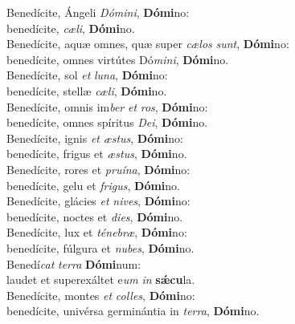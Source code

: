 \evenverse Benedícite, Ángeli \textit{Dó}\textit{mi}\textit{ni}, \textbf{Dó}\textbf{mi}no:~\*\\
\evenverse benedícite, \textit{cæ}\textit{li}, \textbf{Dó}\textbf{mi}no.\\
\oddverse Benedícite, aquæ omnes, quæ super \textit{cæ}\textit{los} \textit{sunt}, \textbf{Dó}\textbf{mi}no:~\*\\
\oddverse benedícite, omnes virtútes Dó\textit{mi}\textit{ni}, \textbf{Dó}\textbf{mi}no.\\
\evenverse Benedícite, sol \textit{et} \textit{lu}\textit{na}, \textbf{Dó}\textbf{mi}no:~\*\\
\evenverse benedícite, stellæ \textit{cæ}\textit{li}, \textbf{Dó}\textbf{mi}no.\\
\oddverse Benedícite, omnis im\textit{ber} \textit{et} \textit{ros}, \textbf{Dó}\textbf{mi}no:~\*\\
\oddverse benedícite, omnes spíritus \textit{De}\textit{i}, \textbf{Dó}\textbf{mi}no.\\
\evenverse Benedícite, ignis \textit{et} \textit{æ}\textit{stus}, \textbf{Dó}\textbf{mi}no:~\*\\
\evenverse benedícite, frigus et \textit{æ}\textit{stus}, \textbf{Dó}\textbf{mi}no.\\
\oddverse Benedícite, rores et \textit{pru}\textit{í}\textit{na}, \textbf{Dó}\textbf{mi}no:~\*\\
\oddverse benedícite, gelu et \textit{fri}\textit{gus}, \textbf{Dó}\textbf{mi}no.\\
\evenverse Benedícite, glácies \textit{et} \textit{ni}\textit{ves}, \textbf{Dó}\textbf{mi}no:~\*\\
\evenverse benedícite, noctes et \textit{di}\textit{es}, \textbf{Dó}\textbf{mi}no.\\
\oddverse Benedícite, lux et \textit{té}\textit{ne}\textit{bræ}, \textbf{Dó}\textbf{mi}no:~\*\\
\oddverse benedícite, fúlgura et \textit{nu}\textit{bes}, \textbf{Dó}\textbf{mi}no.\\
\evenverse Benedí\textit{cat} \textit{ter}\textit{ra} \textbf{Dó}\textbf{mi}num:~\*\\
\evenverse laudet et superexáltet e\textit{um} \textit{in} \textbf{sǽ}\textbf{cu}la.\\
\oddverse Benedícite, montes \textit{et} \textit{col}\textit{les}, \textbf{Dó}\textbf{mi}no:~\*\\
\oddverse benedícite, univérsa germinántia in \textit{ter}\textit{ra}, \textbf{Dó}\textbf{mi}no.\\
